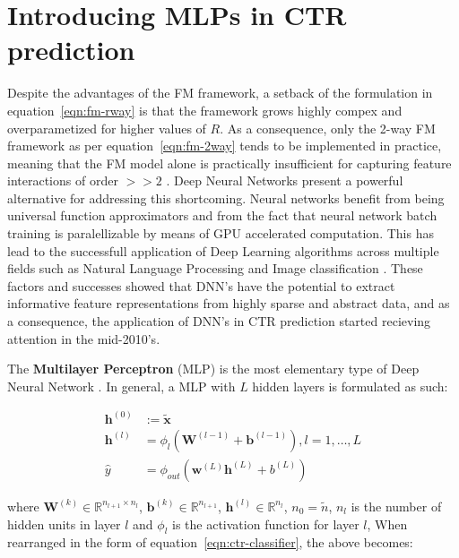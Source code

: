 \documentclass{mldsmsc}
\begin{document}
\section{Introducing MLPs in CTR prediction}

Despite the advantages of the FM framework, a setback of the formulation in equation~\ref{eqn:fm-rway}
is that the framework grows highly compex and overparametized for higher values of $R$.
As a consequence, only the 2-way FM framework as per equation~\ref{eqn:fm-2way} tends to be
implemented in practice, meaning that the FM model alone is practically insufficient for capturing
feature interactions of order $>>2$ \citep{RefWorks:guo2017deepfm:}. Deep Neural Networks
present a powerful alternative for addressing this shortcoming. Neural networks benefit from
being universal function approximators \citep{RefWorks:cybenko1989approximation} and from the
fact that neural network batch training is paralellizable by means of GPU accelerated computation.
This has lead to the successfull application of Deep Learning algorithms across multiple fields
such as Natural Language Processing and Image classification 
\citep{RefWorks:he2016deep,RefWorks:krizhevsky2017imagenet,RefWorks:lecun1998gradient-based}. 
These factors and successes showed that DNN's have the potential to extract informative
feature representations from highly sparse and abstract data, and as a consequence,
the application of DNN's in CTR prediction started recieving attention in the mid-2010's.

The \textbf{Multilayer Perceptron} (MLP) \label{ref:mlp} is the most elementary type of Deep Neural Network
\citep{RefWorks:webster2024week}. In general, a MLP with $L$ hidden layers is formulated as such:

\begin{align}
\label{eqn:mlp}
\mathbf{h}^{(0)} &:= \tilde{\mathbf{x}} \\
\mathbf{h}^{(l)} &= \phi_{l} \left( \mathbf{W}^{(l-1)} + \mathbf{b}^{(l-1)} \right), l = 1, \ldots, L \\
\hat{y} &= \phi_{out} \left( \mathbf{w}^{(L)} \mathbf{h}^{(L)} + b^{(L)} \right)
\end{align}

where $\mathbf{W}^{(k)} \in \mathbb{R}^{n_{l+1} \times n_l } $, $\mathbf{b}^{(k)} \in \mathbb{R}^{n_{l+1}}$,
$\mathbf{h}^{(l)} \in \mathbb{R}^{n_l}$, $n_0 = \tilde{n}$, $n_l$ is the number of hidden
units in layer $l$ and $\phi_{l}$ is the activation function for layer $l$, 
When rearranged in the form of equation~\ref{eqn:ctr-classifier}, the above becomes:
\end{document}
